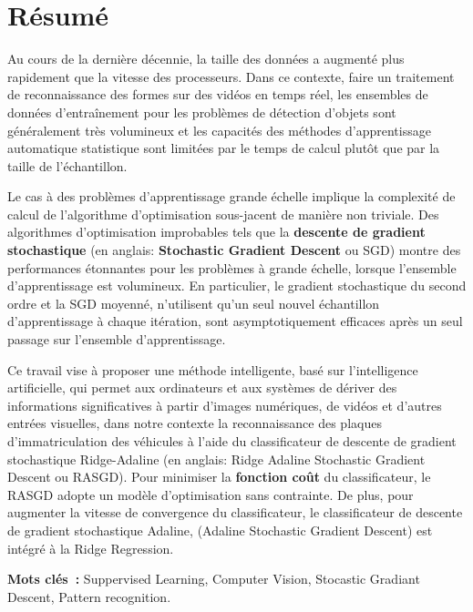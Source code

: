 \chapter*{Résumé} 
	Au cours de la dernière décennie, la taille des données a augmenté plus rapidement que la vitesse des processeurs. 
	Dans ce contexte, faire un traitement de reconnaissance des formes sur des vidéos en temps réel, les ensembles de données d'entraînement pour les problèmes de détection d'objets sont généralement très volumineux et les capacités des méthodes d'apprentissage automatique statistique sont limitées par le temps de calcul plutôt que par la taille de l'échantillon. 
	
	Le cas à des problèmes d'apprentissage grande échelle implique la complexité de calcul de l'algorithme d'optimisation sous-jacent de manière non triviale. Des algorithmes d'optimisation improbables tels que la \textbf{descente de gradient stochastique} (en anglais: \textbf{Stochastic Gradient Descent} ou SGD) montre des performances étonnantes pour les problèmes à grande échelle, lorsque l'ensemble d'apprentissage est volumineux. 
	En particulier, le gradient stochastique du second ordre et la SGD moyenné, n'utilisent qu'un seul nouvel échantillon d'apprentissage à chaque itération, sont asymptotiquement efficaces après un seul passage sur l'ensemble d'apprentissage.
	
	Ce travail vise à proposer une méthode  intelligente, basé sur l'intelligence artificielle, qui permet aux ordinateurs et aux systèmes de dériver des informations significatives à partir d'images numériques, de vidéos et d'autres entrées visuelles, dans notre contexte la reconnaissance des plaques d’immatriculation des véhicules à l'aide du classificateur de descente de gradient stochastique Ridge-Adaline (en anglais: Ridge Adaline Stochastic Gradient Descent ou RASGD).
	Pour minimiser la \textbf{fonction coût} du classificateur, le RASGD adopte un modèle d'optimisation sans contrainte. De plus, pour augmenter la vitesse de convergence du classificateur, le classificateur de descente de gradient stochastique Adaline, (Adaline Stochastic Gradient Descent) est intégré à la Ridge Regression.
	\vspace{1 cm}
	\begin{singlespace}
		\textbf{Mots clés~:} Suppervised Learning, Computer Vision, Stocastic Gradiant Descent, Pattern recognition. 
	\end{singlespace}